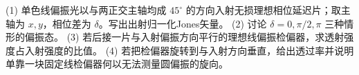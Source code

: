 (1) 单色线偏振光以与两正交主轴均成 \(45^\circ\) 的方向入射无损理想相位延迟片；取主轴为 \(x,y\)，相位差为 \(\delta\)。写出出射归一化Jones矢量。
(2) 讨论 \(\delta=0,\pi/2,\pi\) 三种情形的偏振态。
(3) 若后接一片与入射偏振方向平行的理想线偏振检偏器，求透射强度占入射强度的比值。
(4) 若把检偏器旋转到与入射方向垂直，给出透过率并说明单靠一块固定线检偏器何以无法测量圆偏振的旋向。
